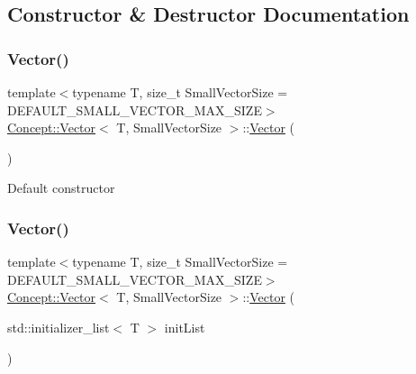 \subsection{Constructor \& Destructor Documentation}
\mbox{\label{class_concept_1_1_vector_a111960a70fa8b29a66ce1549039587d5}} 
\subsubsection{\texorpdfstring{Vector()}{Vector()}\hspace{0.1cm}{\footnotesize\ttfamily [1/7]}}
{\footnotesize\ttfamily template$<$typename T, size\+\_\+t Small\+Vector\+Size = D\+E\+F\+A\+U\+L\+T\+\_\+\+S\+M\+A\+L\+L\+\_\+\+V\+E\+C\+T\+O\+R\+\_\+\+M\+A\+X\+\_\+\+S\+I\+ZE$>$ \\
\mbox{\hyperlink{class_concept_1_1_vector}{Concept\+::\+Vector}}$<$ T, Small\+Vector\+Size $>$\+::\mbox{\hyperlink{class_concept_1_1_vector}{Vector}} (\begin{DoxyParamCaption}{ }\end{DoxyParamCaption})\hspace{0.3cm}{\ttfamily [inline]}}

Default constructor \mbox{\label{class_concept_1_1_vector_a0fa645743cfbf3f3228743390ab30ddc}} 
\subsubsection{\texorpdfstring{Vector()}{Vector()}\hspace{0.1cm}{\footnotesize\ttfamily [2/7]}}
{\footnotesize\ttfamily template$<$typename T, size\+\_\+t Small\+Vector\+Size = D\+E\+F\+A\+U\+L\+T\+\_\+\+S\+M\+A\+L\+L\+\_\+\+V\+E\+C\+T\+O\+R\+\_\+\+M\+A\+X\+\_\+\+S\+I\+ZE$>$ \\
\mbox{\hyperlink{class_concept_1_1_vector}{Concept\+::\+Vector}}$<$ T, Small\+Vector\+Size $>$\+::\mbox{\hyperlink{class_concept_1_1_vector}{Vector}} (\begin{DoxyParamCaption}\item[{std\+::initializer\+\_\+list$<$ T $>$}]{init\+List }\end{DoxyParamCaption})\hspace{0.3cm}{\ttfamily [inline]}}

